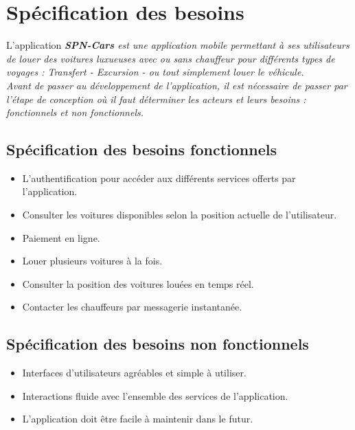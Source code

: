 \section{Spécification des besoins}
L'application \textit{\textbf{SPN-Cars} est une application mobile permettant à ses utilisateurs de louer des voitures luxueuses avec ou sans chauffeur pour différents types de voyages : Transfert - Excursion - ou tout simplement louer le véhicule.\\
    \noindent Avant de passer au développement de l'application, il est nécessaire de passer par l'étape de conception où il faut déterminer les acteurs et leurs besoins : fonctionnels et non fonctionnels.}
\subsection{Spécification des besoins fonctionnels}
\begin{itemize}
    \item L'authentification pour accéder aux différents services offerts par l'application.
    \item Consulter les voitures disponibles selon la position actuelle de l'utilisateur.
    \item Paiement en ligne.
    \item Louer plusieurs voitures à la fois.
    \item Consulter la position des voitures louées en temps réel.
    \item Contacter les chauffeurs par messagerie instantanée.
\end{itemize}
\subsection{Spécification des besoins non fonctionnels}
\begin{itemize}
    \item Interfaces d'utilisateurs agréables et simple à utiliser.
    \item Interactions fluide avec l'ensemble des services de l'application.
    \item L'application doit être facile à maintenir dans le futur.
\end{itemize}
